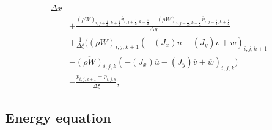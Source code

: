 \begin{align}
{                  } {\Delta x} \nonumber \\
          &+ \frac{ \overline{(\rho W)}_{i,j+\frac{1}{2},k+\frac{1}{2}} \overline{v}_{i,j+\frac{1}{2},k+\frac{1}{2}}
                  - \overline{(\rho W)}_{i,j-\frac{1}{2},k+\frac{1}{2}} \overline{v}_{i,j-\frac{1}{2},k+\frac{1}{2}}
                  } {\Delta y} \nonumber \\
          &+ \frac{1}{\Delta \xi} \Bigg( \overline{(\rho W)}_{i,j,k+1} (-(J_{x}) \overline{u} -(J_{y}) \overline{v} + \overline{w})_{i,j,k+1} \nonumber \\
                                      &- \overline{(\rho W)}_{i,j,k  } (-(J_{x}) \overline{u} -(J_{y}) \overline{v} + \overline{w})_{i,j,k  } \Bigg) \nonumber \\
          &- \frac{ p_{i,j,k+1}
                  - p_{i,j,k  }
                  } {\Delta \xi},
\end{align}

\subsection{Energy equation}

